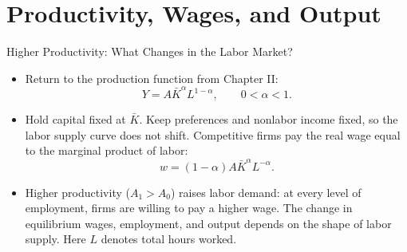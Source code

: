 \documentclass[10pt,aspectratio=169]{beamer}
\begin{document}
\section{Productivity, Wages, and Output}

\begin{frame}{Higher Productivity: What Changes in the Labor Market?}
\begin{itemize}
    \item Return to the production function from Chapter II:
    \[
        Y=A\bar{K}^{\alpha}L^{1-\alpha},
        \qquad 0<\alpha<1.
    \]
    \item Hold capital fixed at $\bar{K}$. Keep preferences and nonlabor income
    fixed, so the labor supply curve does not shift.
    \itemvso Competitive firms pay the real wage equal to the marginal product of labor:
    \[
        w=(1-\alpha)A\bar{K}^{\alpha}L^{-\alpha}.
    \]
    \vspace{-0.5cm}
    \item Higher productivity ($A_1>A_0$) raises labor demand: at every level of
    employment, firms are willing to pay a higher wage.
    \itemvso The change in equilibrium wages, employment, and output depends on
    the shape of labor supply. Here $L$ denotes total hours worked.
\end{itemize}
\end{frame}

\end{document}
